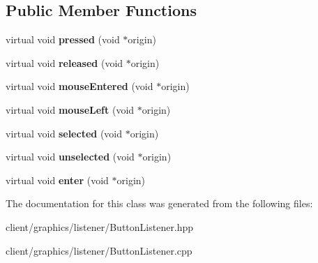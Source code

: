 \subsection*{Public Member Functions}
\begin{DoxyCompactItemize}
\item 
\hypertarget{classgraphics_1_1_button_listener_a8050aee8aae8d6d1987bff25f7dda238}{virtual void {\bfseries pressed} (void $\ast$origin)}\label{classgraphics_1_1_button_listener_a8050aee8aae8d6d1987bff25f7dda238}

\item 
\hypertarget{classgraphics_1_1_button_listener_afe578e82be4e834634acf7694a7a09f6}{virtual void {\bfseries released} (void $\ast$origin)}\label{classgraphics_1_1_button_listener_afe578e82be4e834634acf7694a7a09f6}

\item 
\hypertarget{classgraphics_1_1_button_listener_a17e7810dd9c1b6a537626bae6f6be546}{virtual void {\bfseries mouse\-Entered} (void $\ast$origin)}\label{classgraphics_1_1_button_listener_a17e7810dd9c1b6a537626bae6f6be546}

\item 
\hypertarget{classgraphics_1_1_button_listener_a288e738b03d23393766d4847b72efb25}{virtual void {\bfseries mouse\-Left} (void $\ast$origin)}\label{classgraphics_1_1_button_listener_a288e738b03d23393766d4847b72efb25}

\item 
\hypertarget{classgraphics_1_1_button_listener_ad205cd4ff6ec7eb26f4449c6fedf6e65}{virtual void {\bfseries selected} (void $\ast$origin)}\label{classgraphics_1_1_button_listener_ad205cd4ff6ec7eb26f4449c6fedf6e65}

\item 
\hypertarget{classgraphics_1_1_button_listener_a927a7b3ba8ff581770d1ee4b52cb4c88}{virtual void {\bfseries unselected} (void $\ast$origin)}\label{classgraphics_1_1_button_listener_a927a7b3ba8ff581770d1ee4b52cb4c88}

\item 
\hypertarget{classgraphics_1_1_button_listener_a20c502ab2881bca6c08997639ee9ec3a}{virtual void {\bfseries enter} (void $\ast$origin)}\label{classgraphics_1_1_button_listener_a20c502ab2881bca6c08997639ee9ec3a}

\end{DoxyCompactItemize}


The documentation for this class was generated from the following files\-:\begin{DoxyCompactItemize}
\item 
client/graphics/listener/Button\-Listener.\-hpp\item 
client/graphics/listener/Button\-Listener.\-cpp\end{DoxyCompactItemize}

